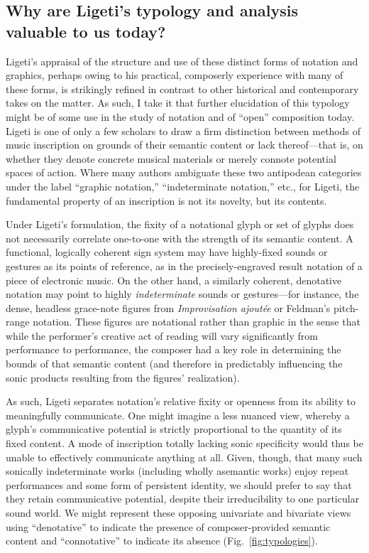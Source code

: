 \subsection{Why are Ligeti's typology and analysis valuable to us today?}

Ligeti's appraisal of the structure and use of these distinct forms of notation and graphics, perhaps owing to his practical, composerly experience with many of these forms, is strikingly refined in contrast to other historical and contemporary takes on the matter. As such, I take it that further elucidation of this typology might be of some use in the study of notation and of ``open'' composition today. Ligeti is one of only a few scholars to draw a firm distinction between methods of music inscription on grounds of their semantic content or lack thereof---that is, on whether they denote concrete musical materials or merely connote potential spaces of action. Where many authors ambiguate these two antipodean categories under the label ``graphic notation,'' ``indeterminate notation,'' etc., for Ligeti, the fundamental property of an inscription is not its novelty, but its contents.

Under Ligeti's formulation, the fixity of a notational glyph or set of glyphs does not necessarily correlate one-to-one with the strength of its semantic content. A functional, logically coherent sign system may have highly-fixed sounds or gestures as its points of reference, as in the precisely-engraved result notation of a piece of electronic music. On the other hand, a similarly coherent, denotative notation may point to highly \textit{indeterminate} sounds or gestures---for instance, the dense, headless grace-note figures from \textit{Improvisation ajoutée} or Feldman's pitch-range notation. These figures are notational rather than graphic in the sense that while the performer's creative act of reading will vary significantly from performance to performance, the composer had a key role in determining the bounds of that semantic content (and therefore in predictably influencing the sonic products resulting from the figures' realization).

As such, Ligeti separates notation's relative fixity or openness from its ability to meaningfully communicate. One might imagine a less nuanced view, whereby a glyph's communicative potential is strictly proportional to the quantity of its fixed content. A mode of inscription totally lacking sonic specificity would thus be unable to effectively communicate anything at all. Given, though, that many such sonically indeterminate works (including wholly asemantic works) enjoy repeat performances and some form of persistent identity, we should prefer to say that they retain  communicative potential, despite their irreducibility to one particular sound world. We might represent these opposing univariate and bivariate views using ``denotative'' to indicate the presence of composer-provided semantic content and ``connotative'' to indicate its absence (Fig.~\ref{fig:typologies}).

